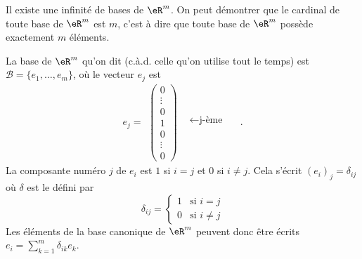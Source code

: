 \begin{example}
    Il existe une infinité de bases de $\eR^m$. On peut démontrer que le cardinal de toute base de $\eR^m$ est $m$, c'est à dire que toute base de $\eR^m$ possède exactement $m$ éléments.

    La base de $\eR^m$ qu'on dit  (c.à.d. celle qu'on utilise tout le temps) est $\mathcal{B}=\{e_1,\ldots, e_m\}$, où le vecteur $e_j$ est 
    \begin{equation}\nonumber
      e_j=
    \begin{array}{cc}
      \begin{pmatrix}
        0\\\vdots\\0\\1\\ 0\\\vdots\\0
      \end{pmatrix} & 
      \begin{matrix}
        \quad\\\quad\\\leftarrow\textrm{j-ème} \quad\\\quad\\\quad\\
      \end{matrix}
    \end{array}.
    \end{equation}
    La composante numéro $j$ de $e_i$ est $1$ si $i=j$ et $0$ si $i\neq j$. Cela s'écrit $(e_i)_j=\delta_{ij}$ où $\delta$ est le  défini par
    \begin{equation}
        \delta_{ij}=\begin{cases}
            1	&	\text{si }i=j\\
            0	&	 \text{si }i\neq j
        \end{cases}
    \end{equation}
    Les éléments de la base canonique de $\eR^m$ peuvent donc être écrits $e_i=\sum_{k=1}^m\delta_{ik}e_k$.
\end{example}

